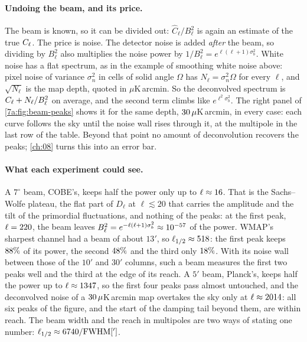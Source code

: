 \paragraph{Undoing the beam, and its price.}
The beam is known, so it can be divided out: $\widehat C_\ell/B_\ell^2$ is again an estimate of
the true $C_\ell$. The price is noise. The detector noise is added \emph{after} the beam, so dividing
by $B_\ell^2$ also multiplies the noise power by $1/B_\ell^2=e^{\ell(\ell+1)\sigma_b^2}$. White
noise has a flat spectrum, as in the example of smoothing white noise above: pixel noise of
variance $\sigma_n^2$ in cells of solid angle $\Omega$ has $N_\ell=\sigma_n^2\Omega$ for every
$\ell$, and $\sqrt{N_\ell}$ is the map depth, quoted in $\mu$K\,arcmin. So the deconvolved spectrum
is $C_\ell+N_\ell/B_\ell^2$ on average, and the second term climbs like $e^{\ell^2\sigma_b^2}$. The right
panel of \cref{7a:fig:beam-peaks} shows it for the same depth, $30\,\mu$K\,arcmin, in
every case: each curve follows the sky until the noise wall rises through it, at the multipole in
the last row of the table. Beyond that point no amount of deconvolution recovers the peaks;
\cref{ch:08} turns this into an error bar.

\paragraph{What each experiment could see.}
A $7^\circ$ beam, COBE's, keeps half the power only up to $\ell\approx16$. That is
the Sachs--Wolfe plateau, the flat part of $D_\ell$ at $\ell\lesssim20$ that carries the amplitude
and the tilt of the primordial fluctuations, and nothing of the peaks: at the first peak, $\ell=220$, the beam leaves
$B_\ell^2=e^{-\ell(\ell+1)\sigma_b^2}\approx10^{-57}$ of the power. WMAP's sharpest
channel had a beam of about $13'$, so $\ell_{1/2}\approx518$: the first peak keeps
$88\%$ of its power, the second $48\%$ and the third only
$18\%$. With its noise wall between those of the $10'$ and $30'$ columns, such a
beam measures the first two peaks well and the third at the edge of its reach. A $5'$
beam, Planck's, keeps half the power up to $\ell\approx1347$, so the first four peaks
pass almost untouched, and the deconvolved noise of a $30\,\mu$K\,arcmin map overtakes
the sky only at $\ell\approx2014$: all six peaks of the figure, and the start of the
damping tail beyond them, are within reach. The beam width and the reach in multipoles are two
ways of stating one number: $\ell_{1/2}\approx6740/{\rm FWHM}[']$.

